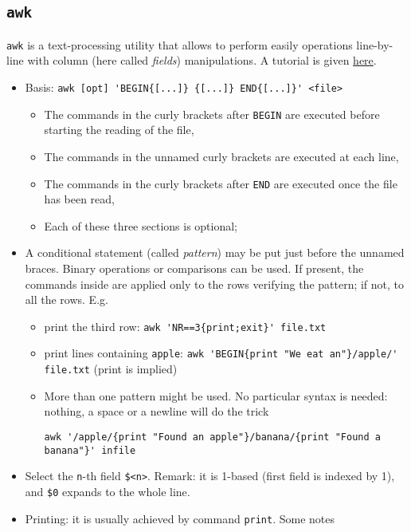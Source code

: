 \documentclass[a4paper,12pt,%
              final%
              ]{article}
\begin{document}
\subsection{\texttt{awk}}
\label{ssec:awk}
\texttt{awk} is a text-processing utility that allows to perform easily operations line-by-line with column (here called \emph{fields}) manipulations. A tutorial is given \href{https://www.tutorialspoint.com/awk/index.htm}{here}.
\begin{itemize}
  \item Basis: \verb|awk [opt] 'BEGIN{[...]} {[...]} END{[...]}' <file>|
    \begin{itemize}
      \item The commands in the curly brackets after \texttt{BEGIN} are executed before starting the reading of the file,
      \item The commands in the unnamed curly brackets are executed at each line,
      \item The commands in the curly brackets after \texttt{END} are executed once the file has been read,
      \item Each of these three sections is optional;
    \end{itemize}
  \item A conditional statement (called \emph{pattern}) may be put just before the unnamed braces. Binary operations or comparisons can be used. If present, the commands inside are applied only to the rows verifying the pattern; if not, to all the rows. E.g.
    \begin{itemize}
      \item print the third row: \verb|awk 'NR==3{print;exit}' file.txt|
      \item print lines containing \texttt{apple}: \verb|awk 'BEGIN{print "We eat an"}/apple/' file.txt| (print is implied)
      \item More than one pattern might be used. No particular syntax is needed: nothing, a space or a newline will do the trick
\begin{verbatim}
awk '/apple/{print "Found an apple"}/banana/{print "Found a banana"}' infile
\end{verbatim}
    \end{itemize}
  \item Select the \texttt{n}-th field \verb|$<n>|. Remark: it is 1-based (first field is indexed by 1), and \verb|$0| expands to the whole line.
  \item Printing: it is usually achieved by command \texttt{print}. Some notes

\end{itemize}
\end{document}
